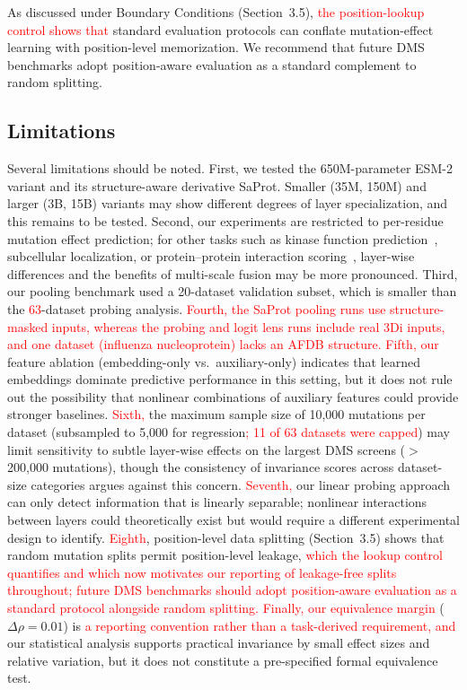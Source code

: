 \documentclass[numbered,webpdf,modern,large]{oup-authoring-template}
\newcommand{\rev}[1]{\textcolor{red}{#1}}
\begin{document}
As discussed under Boundary Conditions (Section~3.5), \rev{the position-lookup
control shows that} standard evaluation protocols can conflate mutation-effect learning with
position-level memorization. We recommend that future DMS benchmarks adopt
position-aware evaluation as a standard complement to random splitting.

\subsection{Limitations}

Several limitations should be noted. First, we tested the 650M-parameter
ESM-2 variant and its structure-aware derivative SaProt. Smaller (35M, 150M)
and larger (3B, 15B) variants may show different degrees of layer specialization,
and this remains to be tested. Second, our
experiments are restricted to per-residue mutation effect prediction; for other
tasks such as kinase function prediction~\cite{kumar2025}, subcellular
localization, or protein--protein interaction scoring~\cite{elshaffei2025},
layer-wise differences and the benefits of multi-scale fusion may be more
pronounced. Third, our pooling benchmark used a 20-dataset validation subset,
which is smaller than the \rev{63}-dataset probing analysis. \rev{Fourth,
the SaProt pooling runs use structure-masked inputs, whereas the probing and logit
lens runs include real 3Di inputs, and one dataset (influenza nucleoprotein) lacks
an AFDB structure. Fifth, our}
feature ablation (embedding-only vs.\ auxiliary-only) indicates that learned embeddings
dominate predictive performance in this setting, but it does
not rule out the possibility that nonlinear combinations of auxiliary features
could provide stronger baselines.
\rev{Sixth,} the
maximum sample size of 10,000 mutations per dataset (subsampled to 5,000 for
regression\rev{; 11 of 63 datasets were capped}) may limit sensitivity to
subtle layer-wise effects on the largest DMS screens ($>$200,000 mutations),
though the consistency of invariance scores across dataset-size categories argues
against this concern. \rev{Seventh,} our linear probing approach can only detect
information that is linearly separable; nonlinear interactions between layers
could theoretically exist but would require a different experimental design to
identify. \rev{Eighth}, position-level data splitting (Section~3.5) shows that
random mutation splits permit position-level leakage, \rev{which the lookup
control quantifies and which now motivates our reporting of leakage-free splits
throughout; future DMS benchmarks should adopt position-aware evaluation as a
standard protocol alongside random splitting. Finally, our equivalence margin}
($\Delta\rho = 0.01$) is \rev{a reporting convention rather than a
task-derived requirement, and} our
statistical analysis supports practical invariance by small effect sizes and
relative variation, but it does not constitute a pre-specified formal equivalence
test.
\end{document}
